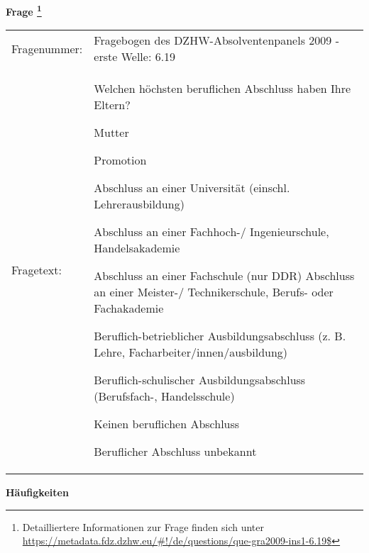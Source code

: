 				\vspace*{0.5cm}
                \noindent\textbf{Frage
	                \footnote{Detailliertere Informationen zur Frage finden sich unter
		              \url{https://metadata.fdz.dzhw.eu/\#!/de/questions/que-gra2009-ins1-6.19$}}}\\
				\begin{tabularx}{\hsize}{@{}lX}
					Fragenummer: &
					  Fragebogen des DZHW-Absolventenpanels 2009 - erste Welle:
					  6.19
 \\
					Fragetext: & Welchen höchsten beruflichen Abschluss haben Ihre Eltern?\par  Mutter\par  Promotion\par  Abschluss an einer Universität (einschl. Lehrerausbildung)\par  Abschluss an einer Fachhoch-/ Ingenieurschule, Handelsakademie\par  Abschluss an einer Fachschule (nur DDR) Abschluss an einer Meister-/ Technikerschule, Berufs- oder Fachakademie\par  Beruflich-betrieblicher Ausbildungsabschluss (z. B. Lehre, Facharbeiter/innen/ausbildung)\par  Beruflich-schulischer Ausbildungsabschluss (Berufsfach-, Handelsschule)\par  Keinen beruflichen Abschluss\par  Beruflicher Abschluss unbekannt \\
				\end{tabularx}





        		\vspace*{0.5cm}
                \noindent\textbf{Häufigkeiten}

